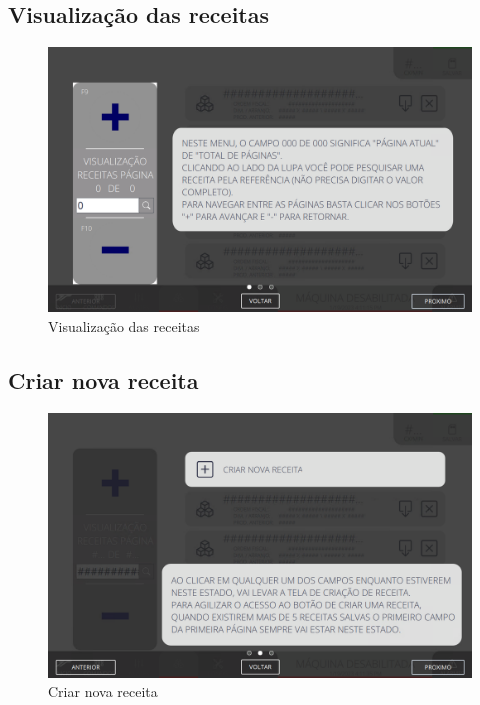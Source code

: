 \thispagestyle{fancy}
\vspace*{40 pt}
\subsection{\small Visualização das receitas}
\vspace*{\fill}
\begin{figure}[h]
    \centering
    \includegraphics[width=480 px,height=300 px]{src/imagesICV/09-request/visualization/e-1.png}
    \caption{Visualização das receitas}
\end{figure}
\vspace*{\fill}

\newpage
\thispagestyle{fancy}
\vspace*{40 pt}
\subsection{\small Criar nova receita}
\vspace*{\fill}
\begin{figure}[h]
    \centering
    \includegraphics[width=576 px,height=360 px]{src/imagesICV/09-request/visualization/e-2.png}
    \caption{Criar nova receita}
\end{figure}
\vspace*{\fill}

